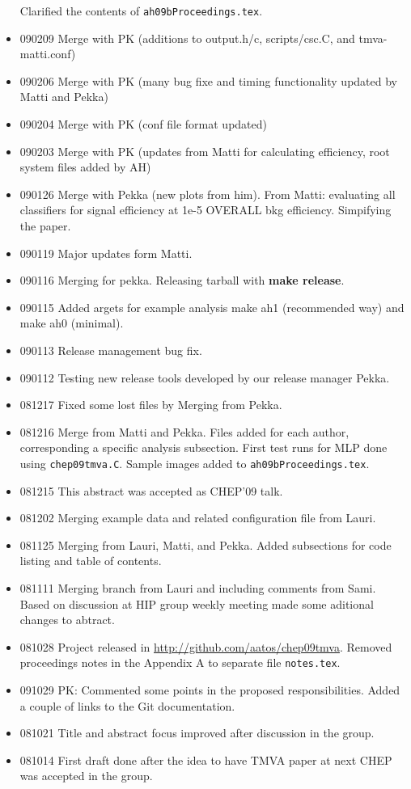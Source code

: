 \begin{appendix}
\begin{itemize}
             Clarified the contents of {\tt ah09bProceedings.tex}.
\item 090209 Merge with PK (additions to output.h/c, scripts/csc.C, and tmva-matti.conf)
\item 090206 Merge with PK (many bug fixe and timing functionality updated by Matti and Pekka)
\item 090204 Merge with PK (conf file format updated)
\item 090203 Merge with PK (updates from Matti for calculating efficiency, 
              root system files added by AH)
\item 090126 Merge with Pekka (new plots from him). 
             From Matti: evaluating all classifiers for signal efficiency 
             at 1e-5 OVERALL bkg efficiency. Simpifying the paper.
\item 090119 Major updates form Matti.
\item 090116 Merging for pekka. Releasing tarball with {\bf make release}.
\item 090115 Added argets for example analysis make ah1 (recommended way) and make ah0 (minimal).
\item 090113 Release management bug fix.
\item 090112 Testing new release tools developed by our release manager Pekka.
\item 081217 Fixed some lost files by Merging from Pekka.
\item 081216 Merge from Matti and Pekka. 
Files added for each author, corresponding a specific analysis subsection.
First test runs for MLP done using {\tt chep09tmva.C}. Sample images added to {\tt ah09bProceedings.tex}.
\item 081215 This abstract was accepted as CHEP'09 talk.
\item 081202 Merging example data and related configuration file from Lauri.
\item 081125 Merging from Lauri, Matti, and Pekka. 
Added subsections for code listing and table of contents.
\item 081111 Merging branch from Lauri and including comments from Sami. 
Based on discussion at HIP group weekly meeting made some aditional changes to abtract.
\item 081028 Project released in \url{http://github.com/aatos/chep09tmva}. Removed proceedings notes in the Appendix A to separate file {\tt notes.tex}.
\item 091029 PK: Commented some points in the proposed
  responsibilities. Added a couple of links to the Git documentation.
\item 081021 Title and abstract focus improved after discussion in the group. 
\item 081014 First draft done after the idea to have TMVA paper at next CHEP was accepted in the group.
\end{itemize}

\end{appendix}
